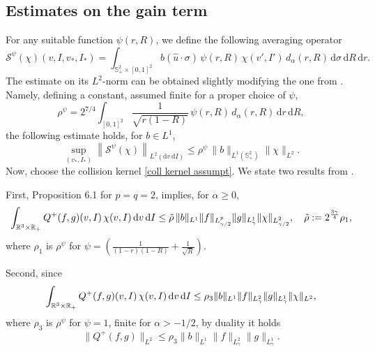 \documentclass[11pt,a4paper]{amsart}
\newcommand{\bRp}{\mathbb{R}_+}
\newcommand{\bRfp}{\mathbb{R}^3 \times \bRp}
\newcommand{\bSp}{\mathbb{S}^2_+}
\newcommand{\mS}{\mathcal{S}}
\newcommand{\md}{\mathrm{d}}
\newcommand{\dpo}{d_\alpha(r,R)}
\newcommand{\dub}{d_\alpha(r,R) }
\newcommand{\g}{\gamma}
\newcommand{\Ls}{L^1}
\newcommand{\domparam}{\bSp \times [0,1]^2}
\begin{document}
\subsection{Estimates on the gain term}
For any suitable function $\psi(r,R)$, we define the following averaging operator
\begin{equation}\label{S operator gen}
	\mS^\psi(\chi)(v,I, v_*, I_*)  =  \int_{  \domparam }  b(\hat{u}\cdot\sigma) \,  \psi(r,R)  \, \chi(v',I')  \, \dpo \, \md \sigma\, \md R \,\md r.
\end{equation}
The estimate on its $L^2$-norm can be obtained slightly  modifying the one from \cite{MC-Alonso-Lp}. Namely, defining a constant, assumed finite for a proper choice of $\psi$,
\begin{equation}\label{rho gen}
	 \rho^\psi  = 2^{7/4}   \int_{[0,1]^2}  \frac{1}{\sqrt{r(1-R)}}\, \psi(r,R) \, \dub \, \md r \, \md R,
\end{equation}
the following estimate holds, for $b \in L^1$,
\begin{equation}\label{S estimate L1 gen}
	\sup_{(v_*, I_*)}	\left\| 	\mS^\psi(\chi) \right\|_{L^{2}(\md v\, \md I)}  \leq   \rho^\psi \,   \| b \|_{\Ls(\bSp)}   \| \chi\|_{L^{2}}.
\end{equation}
Now, choose  the collision kernel \eqref{coll kernel assumpt}. We state two results from \cite{MC-Alonso-Lp}. 

First, Proposition 6.1 for $p=q=2$, implies, for $\alpha \geq 0$,
 	\begin{equation}\label{Lp weak form}
	\int_{\bRfp} Q^+(f, g)(v, I) \, \chi(v, I) \, \md v\, \md I  
	\\
	\leq \tilde{\rho} \,	\| b \|_{\Ls}   \| f    \|_{L^p_{ {\g}/{2}}}  \|  	g    \|_{L^1_{\g}} \| \chi  \|_{L^{2}_{{\g}/{2}}}, \quad \tilde{\rho} := 2^{\frac{3\g }{4}} { \rho_1 },
\end{equation}
where $\rho_1$ is $ \rho^\psi $ for  $\psi = \left( \frac{1}{(1-r)(1-R)} + \frac{1}{\sqrt{R}}\right)$.

Second, since 
	\begin{equation}\label{Lp weak form L2}
	\int_{\bRfp} Q^+(f, g)(v, I) \, \chi(v, I) \, \md v\, \md I  
	\\
	\leq    \rho_3	\| b \|_{\Ls}   \| f    \|_{L^2_{ \g}}  \|  	g    \|_{L^1_{\g}} \| \chi  \|_{L^{2}},
\end{equation}
where $\rho_3$ is $\rho^\psi$ for $\psi=1$, finite for  $\alpha>-1/2$, by duality it holds
	\begin{equation}\label{Lp Q+}
\| Q^+(f, g) \|_{L^2}
	\leq   \rho_3	\| b \|_{\Ls}   \| f    \|_{L^2_{ \g}}  \|  	g    \|_{L^1_{\g}}.
\end{equation}
\end{document}
